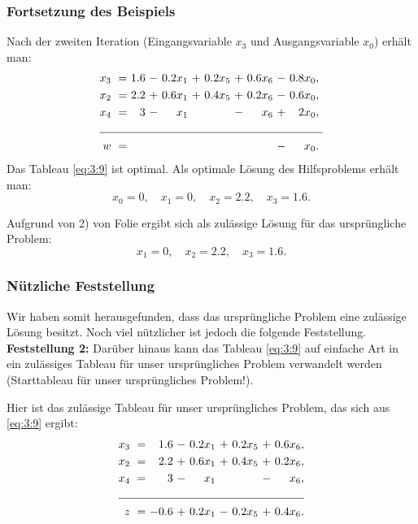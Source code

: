 \documentclass[smaller]{beamer}
\begin{document}
\begin{frame}
 \frametitle{Fortsetzung des Beispiels}
 Nach der zweiten Iteration (Eingangsvariable $x_3$ und Ausgangsvariable $x_0$) erhält man:
\begin{align}
\begin{alignedat}{6}
\label{eq:3:9}
x_3 &\ = &\ 1.6 &\ - &\ 0.2x_1 &\ + &\ 0.2x_5 &\ + &\ 0.6x_6 &\ - &\ 0.8x_0,\ \\
x_2 &\ = &\ 2.2 &\ + &\ 0.6x_1 &\ + &\ 0.4x_5 &\ + &\ 0.2x_6 &\ - &\ 0.6x_0,\ \\
x_4 &\ = &\   3 &\ - &\    x_1 &\   &\        &\ - &\    x_6 &\ + &\   2x_0,\ \\ \cline{1-11}
w   &\ = &\     &\   &\        &\   &\        &\   &\        &\ - &\    x_0.\
\end{alignedat}
\end{align}
 Das Tableau \eqref{eq:3:9} ist optimal. Als optimale Lösung des Hilfsproblems erhält man:
\[
x_0=0,\quad
x_1=0,\quad
x_2=2.2,\quad
x_3=1.6.
\]

Aufgrund von 2) von Folie \pageref{page:3:1} ergibt sich als zulässige Lösung für das ursprüngliche Problem:
\[
x_1=0,\quad
x_2=2.2,\quad
x_3=1.6.
\]
\end{frame}

\begin{frame}
 \frametitle{Nützliche Feststellung}
 Wir haben somit herausgefunden, dass das ursprüngliche Problem eine zulässige Lösung besitzt. Noch viel nützlicher ist jedoch die folgende Feststellung. \\
 \vspace*{0.2cm}
\textbf{Feststellung 2:}
Darüber hinaus kann das Tableau \eqref{eq:3:9} auf einfache Art in ein zulässiges Tableau für unser ursprüngliches Problem verwandelt werden \alert{(Starttableau für unser ursprüngliches Problem!)}.

Hier ist das zulässige Tableau für unser ursprüngliches Problem, das sich aus \eqref{eq:3:9} ergibt:
\begin{align}
\begin{alignedat}{5}
\label{eq:3:10}
x_3 &\ = &\  1.6 &\ - &\ 0.2x_1 &\ + &\ 0.2x_5 &\ + &\ 0.6x_6, \\
x_2 &\ = &\  2.2 &\ + &\ 0.6x_1 &\ + &\ 0.4x_5 &\ + &\ 0.2x_6, \\
x_4 &\ = &\    3 &\ - &\    x_1 &\   &\        &\ - &\    x_6, \\ \cline{1-9}
  z &\ = &\ -0.6 &\ + &\ 0.2x_1 &\ - &\ 0.2x_5 &\ + &\ 0.4x_6. 
\end{alignedat}
\end{align}
\end{frame}
\end{document}
